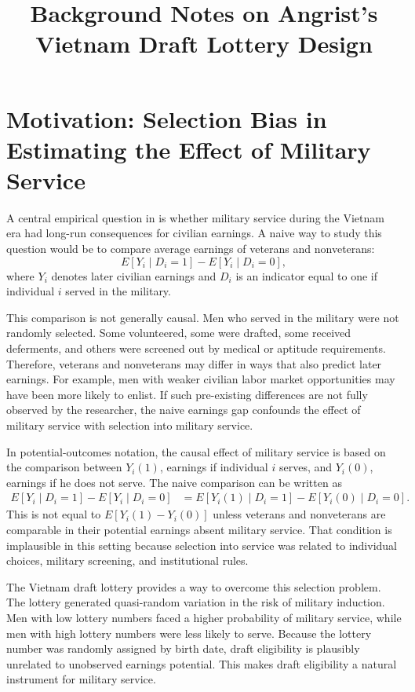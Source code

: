 \documentclass[11pt,a4paper]{article}
\title{Background Notes on Angrist's Vietnam Draft Lottery Design}
\author{}
\date{}
\begin{document}
\maketitle

\section{Motivation: Selection Bias in Estimating the Effect of Military Service}

A central empirical question in \citet{angrist1990} is whether military service during the Vietnam era had long-run consequences for civilian earnings. A naive way to study this question would be to compare average earnings of veterans and nonveterans:
\begin{equation}
    E[Y_i \mid D_i = 1] - E[Y_i \mid D_i = 0],
\end{equation}
where $Y_i$ denotes later civilian earnings and $D_i$ is an indicator equal to one if individual $i$ served in the military.

This comparison is not generally causal. Men who served in the military were not randomly selected. Some volunteered, some were drafted, some received deferments, and others were screened out by medical or aptitude requirements. Therefore, veterans and nonveterans may differ in ways that also predict later earnings. For example, men with weaker civilian labor market opportunities may have been more likely to enlist. If such pre-existing differences are not fully observed by the researcher, the naive earnings gap confounds the effect of military service with selection into military service.

In potential-outcomes notation, the causal effect of military service is based on the comparison between $Y_i(1)$, earnings if individual $i$ serves, and $Y_i(0)$, earnings if he does not serve. The naive comparison can be written as
\begin{align}
    E[Y_i \mid D_i = 1] - E[Y_i \mid D_i = 0]
    &= E[Y_i(1) \mid D_i = 1] - E[Y_i(0) \mid D_i = 0].
\end{align}
This is not equal to $E[Y_i(1)-Y_i(0)]$ unless veterans and nonveterans are comparable in their potential earnings absent military service. That condition is implausible in this setting because selection into service was related to individual choices, military screening, and institutional rules.

The Vietnam draft lottery provides a way to overcome this selection problem. The lottery generated quasi-random variation in the risk of military induction. Men with low lottery numbers faced a higher probability of military service, while men with high lottery numbers were less likely to serve. Because the lottery number was randomly assigned by birth date, draft eligibility is plausibly unrelated to unobserved earnings potential. This makes draft eligibility a natural instrument for military service.
\end{document}
